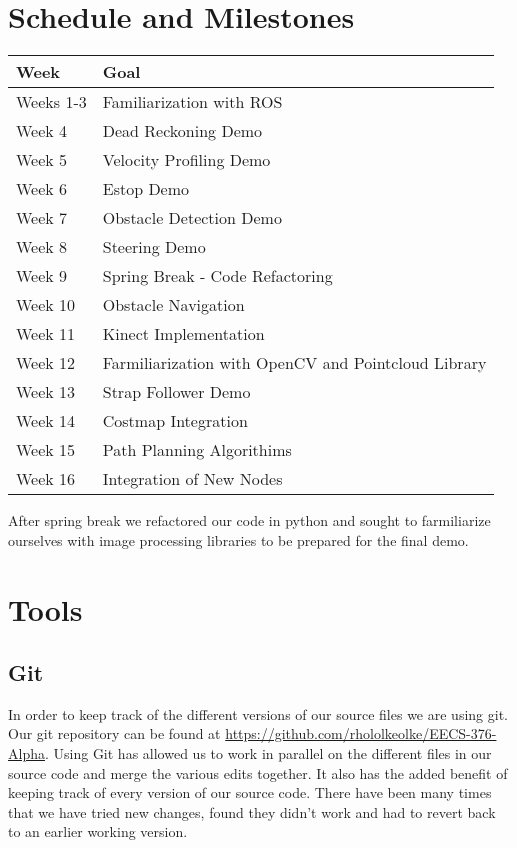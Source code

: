 
\section{Schedule and Milestones}

\begin{longtable}{|l|l|}
  \hline {\bf Week} & {\bf Goal} \\ \hline
Weeks 1-3 & Familiarization with ROS \\ \hline
Week 4 & Dead Reckoning Demo \\ \hline
Week 5 & Velocity Profiling Demo \\ \hline
Week 6 & Estop Demo \\ \hline
Week 7 & Obstacle Detection Demo \\ \hline
Week 8 & Steering Demo \\ \hline
Week 9 & Spring Break - Code Refactoring \\ \hline
Week 10 & Obstacle Navigation \\ \hline
Week 11 & Kinect Implementation \\ \hline
Week 12 & Farmiliarization with OpenCV and Pointcloud Library \\ \hline
Week 13 & Strap Follower Demo \\ \hline
Week 14 & Costmap Integration \\ \hline
Week 15 & Path Planning Algorithims \\ \hline
Week 16 & Integration of New Nodes \\ \hline
\end{longtable}

After spring break we refactored our code in python and sought to farmiliarize ourselves with image processing libraries to be prepared for the final demo.

\section{Tools}


\subsection{Git}

In order to keep track of the different versions of our source files
we are using git.  Our git repository can be found at
\url{https://github.com/rhololkeolke/EECS-376-Alpha}.  Using Git has
allowed us to work in parallel on the different files in our source
code and merge the various edits together.  It also has the added
benefit of keeping track of every version of our source code. There
have been many times that we have tried new changes, found they didn't
work and had to revert back to an earlier working version.

